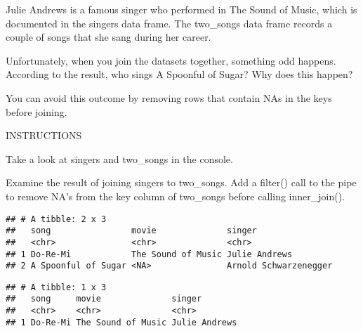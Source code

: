 \documentclass[]{article}
\newenvironment{Shaded}{\begin{snugshade}}{\end{snugshade}}
\newcommand{\KeywordTok}[1]{\textcolor[rgb]{0.13,0.29,0.53}{\textbf{#1}}}
\newcommand{\DataTypeTok}[1]{\textcolor[rgb]{0.13,0.29,0.53}{#1}}
\newcommand{\StringTok}[1]{\textcolor[rgb]{0.31,0.60,0.02}{#1}}
\newcommand{\CommentTok}[1]{\textcolor[rgb]{0.56,0.35,0.01}{\textit{#1}}}
\newcommand{\OperatorTok}[1]{\textcolor[rgb]{0.81,0.36,0.00}{\textbf{#1}}}
\newcommand{\NormalTok}[1]{#1}
\begin{document}
Julie Andrews is a famous singer who performed in The Sound of Music,
which is documented in the singers data frame. The two\_songs data frame
records a couple of songs that she sang during her career.

Unfortunately, when you join the datasets together, something odd
happens. According to the result, who sings A Spoonful of Sugar? Why
does this happen?

You can avoid this outcome by removing rows that contain NAs in the keys
before joining.

INSTRUCTIONS

Take a look at singers and two\_songs in the console.

Examine the result of joining singers to two\_songs. Add a filter() call
to the pipe to remove NA's from the key column of two\_songs before
calling inner\_join().

\begin{Shaded}
\end{Shaded}

\begin{verbatim}
## # A tibble: 2 x 3
##   song                movie              singer               
##   <chr>               <chr>              <chr>                
## 1 Do-Re-Mi            The Sound of Music Julie Andrews        
## 2 A Spoonful of Sugar <NA>               Arnold Schwarzenegger
\end{verbatim}

\begin{Shaded}
\end{Shaded}

\begin{verbatim}
## # A tibble: 1 x 3
##   song     movie              singer       
##   <chr>    <chr>              <chr>        
## 1 Do-Re-Mi The Sound of Music Julie Andrews
\end{verbatim}
\end{document}
